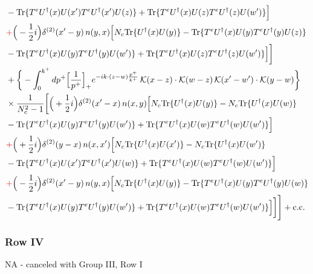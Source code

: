 \documentclass[9pt]{article}
\numberwithin{equation}{section}
\begin{document}
\begin{align}
& -{\rm Tr}\{T^{e}U^{\dagger}(x)U(x')T^{e}U^{\dagger}(x')U(z)\}+{\rm Tr}\{T^{e}U^{\dagger}(x)U(z)T^{e}U^{\dagger}(z)U(w')\}\Big]\notag\\
& {\color{red}+}\Big(-\frac{1}{2}i\Big)\delta^{(2)}(x'-y)\,n(y,x)\Big[N_{c}{\rm Tr}\{U^{\dagger}(x)U(y)\}-{\rm Tr}\{T^{e}U^{\dagger}(x)U(y)T^{e}U^{\dagger}(y)U(z)\}\notag\\
& -{\rm Tr}\{T^{e}U^{\dagger}(x)U(y)T^{e}U^{\dagger}(y)U(w')\}+{\rm Tr}\{T^{e}U^{\dagger}(x)U(z)T^{e}U^{\dagger}(z)U(w')\}\Big]\bigg]\notag\\
&+\bigg\{-\int_{0}^{k^{+}}dp^{+}\Big[\frac{1}{p^{+}}\Big]_{+}e^{-ik\cdot(z-w)\frac{p^{+}}{k^{+}}}\,\mathcal{K}(x-z)\cdot\mathcal{K}(w-z)\,\mathcal{K}(x'-w')\cdot\mathcal{K}(y-w)\bigg\}\notag\\
&\times \frac{1}{N_{c}^{2}-1}\bigg[\Big(+\frac{1}{2}i\Big)\delta^{(2)}(x'-x)\,n(x,y)\Big[N_{c}{\rm Tr}\{U^{\dagger}(x)U(y)\}-N_{c}{\rm Tr}\{U^{\dagger}(x)U(w)\}\notag\\
& -{\rm Tr}\{T^{e}U^{\dagger}(x)U(y)T^{e}U^{\dagger}(y)U(w')\}+{\rm Tr}\{T^{e}U^{\dagger}(x)U(w)T^{e}U^{\dagger}(w)U(w')\}\Big]\notag\\
& {\color{red}+}\Big(+\frac{1}{2}i\Big)\delta^{(2)}(y-x)\,n(x,x')\Big[N_{c}{\rm Tr}\{U^{\dagger}(x)U(x')\}-N_{c}{\rm Tr}\{U^{\dagger}(x)U(w')\}\notag\\
& -{\rm Tr}\{T^{e}U^{\dagger}(x)U(x')T^{e}U^{\dagger}(x')U(w)\}+{\rm Tr}\{T^{e}U^{\dagger}(x)U(w)T^{e}U^{\dagger}(w)U(w')\}\Big]\notag\\
& {\color{red}+}\Big(-\frac{1}{2}i\Big)\delta^{(2)}(x'-y)\,n(y,x)\Big[N_{c}{\rm Tr}\{U^{\dagger}(x)U(y)\}-{\rm Tr}\{T^{e}U^{\dagger}(x)U(y)T^{e}U^{\dagger}(y)U(w)\}\notag\\
& -{\rm Tr}\{T^{e}U^{\dagger}(x)U(y)T^{e}U^{\dagger}(y)U(w')\}+{\rm Tr}\{T^{e}U^{\dagger}(x)U(w)T^{e}U^{\dagger}(w)U(w')\}\Big]\bigg]\Bigg]+{\rm c.c.}\label{eq:E-I.III-2}
\end{align}
\subsubsection*{Row IV}
\textsc{NA} - canceled with Group III, Row I
\end{document}
